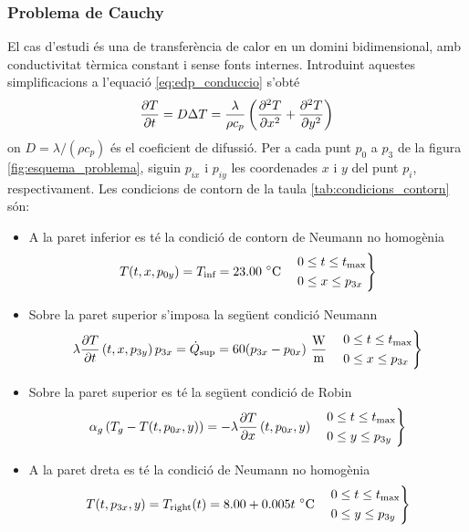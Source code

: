 \subsubsection{Problema de Cauchy}

El cas d'estudi és una de transferència de calor en un domini bidimensional, amb conductivitat tèrmica constant i sense fonts internes. Introduint aquestes simplificacions a l'equació \eqref{eq:edp_conduccio} s'obté
\begin{equation} \label{eq:edp_problema}
	\pdv{T}{t} = 
	D \Delta{T} = 
	\frac{\lambda}{\rho c_p} \left( \pdv[2]{T}{x} + \pdv[2]{T}{y} \right)
\end{equation}
on $D = \lambda / \left( \rho c_p \right)$ és el coeficient de difussió. Per a cada punt $p_0$ a $p_3$ de la figura \ref{fig:esquema_problema}, siguin $p_{ix}$ i $p_{iy}$ les coordenades $x$ i $y$ del punt $p_i$, respectivament. Les condicions de contorn de la taula \ref{tab:condicions_contorn} són:
\begin{itemize}
	\item A la paret inferior es té la condició de contorn de Neumann no homogènia
	\begin{equation} \label{eq:condicio_01}
		T(t,x,p_{0y}) = T_\text{inf} = 23.00 \ \celsius 
		\quad 
		\left.
		\begin{aligned}
			&0 \leq t \leq t_\text{max} \\
			&0 \leq x \leq p_{3x}
		\end{aligned}
		\right\}
	\end{equation}
	\item Sobre la paret superior s'imposa la següent condició Neumann
	\begin{equation} \label{eq:condicio_02}
		\lambda \pdv{T}{t} \, (t,x,p_{3y}) \, p_{3x} = \dot{Q}_\text{sup} = 60 (p_{3x} - p_{0x}) \ \frac{\watt}{\meter} 
		\quad 
		\left.
		\begin{aligned}
			&0 \leq t \leq t_\text{max} \\
			&0 \leq x \leq p_{3x}
		\end{aligned}
		\right\}		
	\end{equation}
	\item Sobre la paret superior es té la següent condició de Robin 
	\begin{equation} \label{eq:condicio_03}
		\alpha_g \left( T_g - T(t,p_{0x},y) \right) = -\lambda \pdv{T}{x} \, (t,p_{0x},y) 
		\quad 
		\left.
		\begin{aligned}
			&0 \leq t \leq t_\text{max} \\
			&0 \leq y \leq p_{3y}
		\end{aligned}
		\right\}
	\end{equation}
	\item A la paret dreta es té la condició de Neumann no homogènia
	\begin{equation} \label{eq:condicio_04}
		T(t,p_{3x},y) = T_\text{right}(t) = 8.00 + 0.005 t \ \celsius
		\quad
		\left.
		\begin{aligned}
			&0 \leq t \leq t_\text{max} \\
			&0 \leq y \leq p_{3y}
		\end{aligned}
		\right\}
	\end{equation}
\end{itemize}
